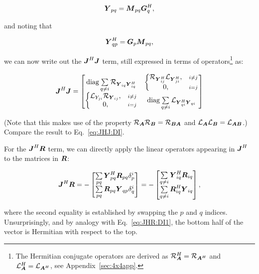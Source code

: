 \documentclass[useAMS,usenatbib]{mn2e}
\newcommand{\mat}[1]{{\bmath{#1}}}
\newcommand{\JJ}{\mat{J}} %
\newcommand{\MM}{\mat{M}}
\newcommand{\RR}{\mat{R}}
\newcommand{\GG}{\mat{G}}
\newcommand{\JHJ}{\JJ^H\JJ} %
\begin{document}
\newcommand{\YY}{\mat{Y}}
\newcommand{\ZZ}{\mat{Z}}
\[
\YY_{pq} = \MM_{pq} \GG^H_q,
\]

and noting that 

\[
\YY_{qp}^H = \GG_p \MM_{pq},
\]

we can now write out the $\JHJ$ term, still expressed in terms of operators\footnote{The Hermitian
conjugate operators are derived as $\Rop{\mat{A}}^H=\Rop{\mat{A}^H}$ and $\Lop{\mat{A}}^H=\Lop{\mat{A}^H}$,
see Appendix~\ref{sec:4x4app}.} as:

\begin{equation}
\label{eq:JHJ:pol}
\JHJ = \Matrix{cc}{
  \mathrm{diag}\sum\limits_{q\ne i} \Rop{\YY_{iq} \YY^H_{iq}} & 
  \left \{ 
  \begin{array}{@{}cc@{}}
   \Rop{ \YY^H_{ij}  } \Lop{\YY^H_{ji}},&{\scriptstyle i\ne j} \\
   0, &{\scriptstyle i=j}
  \end{array} \right . 
  \\
  \left \{ 
  \begin{array}{@{}cc@{}}
   \Lop{ Y_{ji}  } \Rop{\YY_{ij}},&{\scriptstyle i\ne j} \\
   0, &{\scriptstyle i=j}
  \end{array} \right . 
  &
  \mathrm{diag}\sum\limits_{q\ne i} \Lop{\YY^H_{qi}\YY_{qi}}
}
\end{equation}

(Note that this makes use of the property $\Rop{\mat{A}}\Rop{\mat{B}}=\Rop{\mat{BA}}$ and 
$\Lop{\mat{A}}\Lop{\mat{B}}=\Lop{\mat{AB}}$.) Compare the result to Eq.~\ref{eq:JHJ:DI}.

For the $\JJ^H\bmath{R}$ term, we can directly apply the linear operators appearing in $\JJ^H$ 
to the matrices in $\bmath{R}$:

\begin{equation}
\JJ^H\bmath{R} = -\Matrix{c}{ 
\sum\limits_{pq} \YY^H_{pq} \RR_{pq} \delta^{i}_p  \\
\sum\limits_{pq} \RR_{pq} \YY_{qp} \delta^{i}_q 
} = -\Matrix{c}{
\sum\limits_{q\ne i} \YY^H_{iq} \RR_{iq} \\
\sum\limits_{q\ne i} \RR^H_{iq} \YY_{iq}  
},
\end{equation}

where the second equality is established by swapping the $p$ and $q$ indices. Unsurprisingly, and by analogy with 
Eq.~\ref{eq:JHR:DI1}, the bottom half of the vector is Hermitian with respect to the top.
\end{document}
